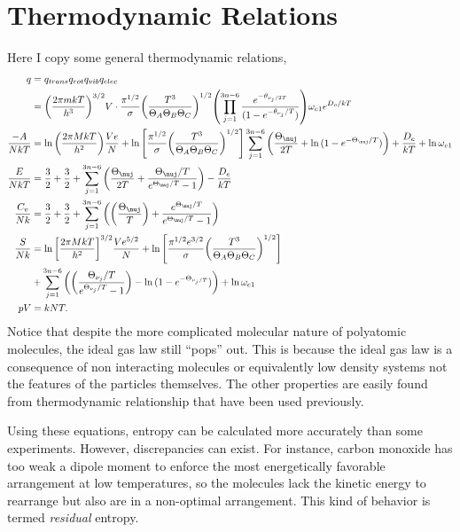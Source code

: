 \section{Thermodynamic Relations}%
\label{sec:polytr}
Here I copy some general thermodynamic relations,
\begin{align*}
	q &= q_{trans} q_{rot} q_{vib} q_{elec}\\
	  &= {\left(\frac{2\pi mkT}{h^3}\right)}^{3/2}V \cdot
		 \frac{\pi^{1/2}}{\sigma}
		 {\left(\frac{T^3}{\Theta_A \Theta_B \Theta_{C}}\right)}^{1/2}
		 {\left(\prod_{j=1}^{3n-6}{\frac{e^{-\theta_{\nu_{j}/2T}}}{(1 -
		 e^{-\theta_{\nu_{j}}/T})}}\right)}
		 \omega_{e1} e^{D_o /kT}\\
	\frac{-A}{NkT} &= \ln{\left(\frac{2\pi MkT}{h^2}\right)}
		 \frac{Ve}{N} + \ln{\left[\frac{\pi^{1/2}}{\sigma}
		 {\left(\frac{T^3}{\Theta_A \Theta_B \Theta_{C}}\right)}^{1/2}
		 \right]}
		 \sum_{j=1}^{3n-6}{\left(\frac{\Theta_{\nuj}}{2T} +
		 \ln{(1 - e^{-\Theta_{\nuj}/T})}\right)} +
		 \frac{D_e}{kT} + \ln{\omega_{e1}}\\
	\frac{E}{NkT} &= \frac{3}{2} + \frac{3}{2} +
		\sum_{j=1}^{3n-6}{\left(\frac{\Theta_{\nuj}}{2T} +
		\frac{\Theta_{\nuj}/T}{e^{\Theta_{\nuj}/T} - 1}\right)}-
		\frac{D_e}{kT}\\
	\frac{C_v}{Nk} &= \frac{3}{2} + \frac{3}{2} + 
		\sum_{j=1}^{3n-6}{\left({\left(\frac{\Theta_{\nuj}}{T}\right)} +
		\frac{e^{\Theta_{\nuj}/T}}{e^{\Theta_{\nuj}/T} - 1}\right)}\\
	\frac{S}{Nk} &= \ln{\left[\frac{2\pi MkT}{h^{2}}\right]}^{3/2}
	\frac{Ve^{5/2}}{N} + \ln{\left[\frac{\pi^{1/2} e^{3/2}}{\sigma}
	{\left(\frac{T^3}{\Theta_A \Theta_B \Theta_{C}}\right)}^{1/2}\right]}\\
	&+ \sum_{j=1}^{3n-6}{\left({\left(\frac{\Theta_{\nu_j}/T}%
	{e^{\Theta_{\nu_j}/T} - 1}\right)} - \ln{(1 -
	e^{-\Theta_{\nu_{j}/T}})}\right)} + \ln{\omega_{e1}}\\
	pV &= kNT.
\end{align*}
Notice that despite the more complicated molecular nature of polyatomic
molecules, the ideal gas law still ``pops'' out. This is because the ideal gas
law is a consequence of non interacting molecules or equivalently low density
systems not the features of the particles themselves. The other properties are
easily found from thermodynamic relationship that have been used previously.

Using these equations, entropy can be calculated more accurately than some
experiments. However, discrepancies can exist. For instance, carbon monoxide has
too weak a dipole moment to enforce the most energetically favorable arrangement
at low temperatures, so the molecules lack the kinetic energy to rearrange but
also are in a non-optimal arrangement. This kind of behavior is termed
\textit{residual} entropy.
